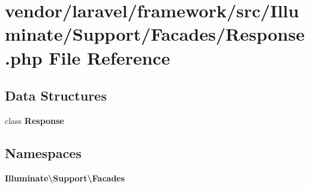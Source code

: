 \section{vendor/laravel/framework/src/\+Illuminate/\+Support/\+Facades/\+Response.php File Reference}
\label{laravel_2framework_2src_2_illuminate_2_support_2_facades_2_response_8php}
\subsection*{Data Structures}
\begin{DoxyCompactItemize}
\item 
class {\bf Response}
\end{DoxyCompactItemize}
\subsection*{Namespaces}
\begin{DoxyCompactItemize}
\item 
 {\bf Illuminate\textbackslash{}\+Support\textbackslash{}\+Facades}
\end{DoxyCompactItemize}
